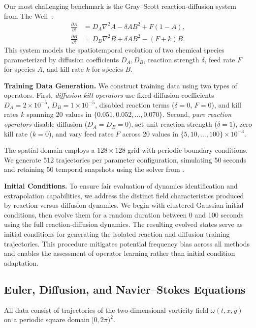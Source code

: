 \documentclass{article}
\theoremstyle{plain}
\theoremstyle{definition}
\theoremstyle{remark}
\begin{document}
Our most challenging benchmark is the Gray--Scott reaction-diffusion system from The Well~\citep{ohana2024well}: 
\begin{align} 
\frac{\partial A}{\partial t} &= D_A \nabla^2 A - \delta AB^2 + F(1-A), \\
\frac{\partial B}{\partial t} &= D_B \nabla^2 B + \delta AB^2 - (F+k)B.
\end{align} 
This system models the spatiotemporal evolution of two chemical species parameterized by diffusion coefficients $D_A, D_B$, reaction strength $\delta$, feed rate $F$ for species $A$, and kill rate $k$ for species $B$. 

\textbf{Training Data Generation.} We construct training data using two types of operators. First, \textit{diffusion-kill operators} use fixed diffusion coefficients $D_A=2 \times 10^{-5}$, $D_B=1 \times 10^{-5}$, disabled reaction terms ($\delta = 0$, $F=0$), and kill rates $k$ spanning 20 values in $\{0.051, 0.052, \ldots, 0.070\}$. Second, \textit{pure reaction operators} disable diffusion ($D_A=D_B=0$), set unit reaction strength ($\delta = 1$), zero kill rate ($k=0$), and vary feed rates $F$ across 20 values in $\{5, 10, \ldots, 100\} \times 10^{-3}$.

The spatial domain employs a $128 \times 128$ grid with periodic boundary conditions. We generate 512 trajectories per parameter configuration, simulating 50 seconds and retaining 50 temporal snapshots using the solver from \citet{ohana2024well}.

\textbf{Initial Conditions.} To ensure fair evaluation of dynamics identification and extrapolation capabilities, we address the distinct field characteristics produced by reaction versus diffusion dynamics. We begin with clustered Gaussian initial conditions, then evolve them for a random duration between 0 and 100 seconds using the full reaction-diffusion dynamics. The resulting evolved states serve as initial conditions for generating the isolated reaction and diffusion training trajectories. This procedure mitigates potential frequency bias across all methods and enables the assessment of operator learning rather than initial condition adaptation.


\subsection{Euler, Diffusion, and Navier--Stokes Equations}

All data consist of trajectories of the two-dimensional vorticity field
\(\omega(t,x,y)\) on a periodic square domain \([0,2\pi)^2\).
\end{document}
